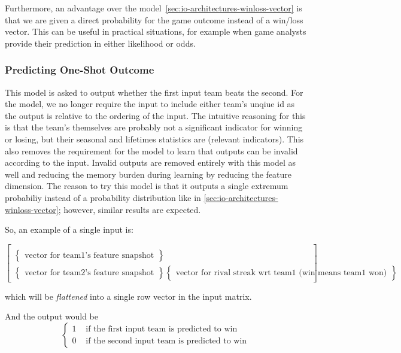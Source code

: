 \documentclass{article} %
\begin{document}
Furthermore, an advantage over the model~\ref{sec:io-architectures-winloss-vector} is that we are given a direct probability for the game outcome instead of a win/loss vector.  This can be useful in practical situations, for example when game analysts provide their prediction in either likelihood or odds.


\subsubsection{Predicting One-Shot Outcome}
\label{sec:io-architectures-oneshot}

This model is asked to output whether the first input team beats the second. For the model, we no longer require the input to include either team's unqiue id as the output is relative to the ordering of the input.
The intuitive reasoning for this is that the team's themselves are probably not a significant indicator for winning or losing, but their seasonal and lifetimes statistics are (relevant indicators).
This also removes the requirement for the model to learn that outputs can be invalid according to the input.
Invalid outputs are removed entirely with this model as well and reducing the memory burden during learning by reducing the feature dimension.
The reason to try this model is that it outputs a single extremum probabiliy instead of a probability distribution like in \ref{sec:io-architectures-winloss-vector}; however, similar results are expected.

So, an example of a single input is:

\[
\begin{bmatrix}
  \\
  \begin{Bmatrix}
    \text{vector for team1's feature snapshot}
  \end{Bmatrix}
  \\
  \begin{Bmatrix}
    \text{vector for team2's feature snapshot}
  \end{Bmatrix}
  \begin{Bmatrix}
    \text{vector for rival streak wrt team1 (win means team1 won)}
  \end{Bmatrix}
\end{bmatrix}
\]

which will be \textit{flattened} into a single row vector in the input matrix.

And the output would be
\[
\begin{cases}
  1 & \text{ if the first input team is predicted to win}
  \\
  0 & \text{ if the second input team is predicted to win}
\end{cases}
\]
\end{document}
